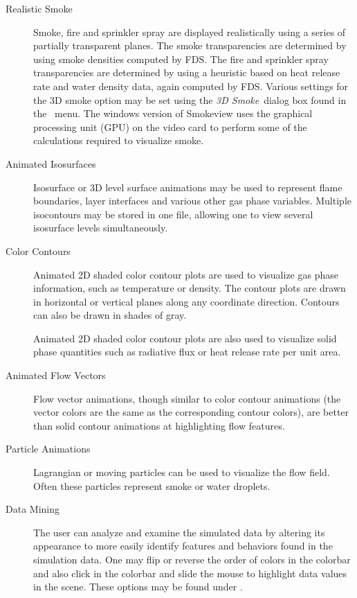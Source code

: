 \documentclass[11pt,twoside]{book}
\newcommand{\frameit}[1]{\fbox{\tt #1}}
\begin{document}
\begin{description}
\item[Realistic Smoke] Smoke, fire and sprinkler spray are displayed
realistically using a series of partially transparent planes.  The
smoke transparencies are determined by using smoke densities
computed by FDS.  The fire and sprinkler spray transparencies are
determined by using a heuristic based on heat release rate and
water density data, again computed by FDS. Various settings for
the 3D smoke option may be set using the {\em 3D Smoke}\ dialog
box found in the \frameit{Dialogs}\ menu.  The windows version of
Smokeview uses the graphical processing unit (GPU) on the video
card to perform some of the calculations required to visualize smoke.

\item[Animated Isosurfaces] Isosurface or 3D level surface
animations may be used to represent flame boundaries, layer
interfaces and various other gas phase variables. Multiple
isocontours may be stored in one file, allowing one to
view several isosurface levels simultaneously.

\item[Color Contours] Animated 2D shaded color contour plots are
used to visualize gas phase information, such as temperature or
density. The contour plots are drawn in horizontal or vertical
planes along any coordinate direction.  Contours can also be drawn
in shades of gray.

Animated 2D shaded color contour plots are also used to
visualize solid phase quantities such as radiative flux or
heat release rate per unit area.

\item[Animated Flow Vectors] Flow vector animations, though
similar to color contour animations (the vector colors are
the same as the corresponding contour colors), are better
than solid contour animations at highlighting flow
features.

\item[Particle Animations] Lagrangian or moving particles can be
used to visualize the flow field. Often these particles represent
smoke or water droplets.

\item[Data Mining] The user can analyze and examine the simulated
data by altering its appearance to more easily identify features
and behaviors found in the simulation data. One may flip or
reverse the order of colors in the colorbar and also click in the
colorbar and slide the mouse to highlight data values in the
scene. These options may be found under \frameit{Options/Shades}.


\end{description}
\end{document}
